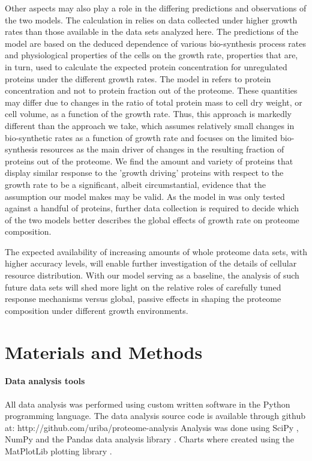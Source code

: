 \documentclass[10pt,letterpaper]{article}
\begin{document}
Other aspects may also play a role in the differing predictions and observations of the two models.
The calculation in \cite{Klumpp2009} relies on data collected under higher growth rates than those available in the data sets analyzed here.
The predictions of the model are based on the deduced dependence of various bio-synthesis process rates and physiological properties of the cells on the growth rate, properties that are, in turn, used to calculate the expected protein concentration for unregulated proteins under the different growth rates.
The model in \cite{Klumpp2009} refers to protein concentration and not to protein fraction out of the proteome. These quantities may differ due to changes in the ratio of total protein mass to cell dry weight, or cell volume, as a function of the growth rate.
Thus, this approach is markedly different than the approach we take, which assumes relatively small changes in bio-synthetic rates as a function of growth rate and focuses on the limited bio-synthesis resources as the main driver of changes in the resulting fraction of proteins out of the proteome.
We find the amount and variety of proteins that display similar response to the 'growth driving' proteins with respect to the growth rate to be a significant, albeit circumstantial, evidence that the assumption our model makes may be valid.
As the model in \cite{Klumpp2009} was only tested against a handful of proteins, further data collection is required to decide which of the two models better describes the global effects of growth rate on proteome composition.

The expected availability of increasing amounts of whole proteome data sets, with higher accuracy levels, will enable further investigation of the details of cellular resource distribution.
With our model serving as a baseline, the analysis of such future data sets will shed more light on the relative roles of carefully tuned response mechanisms versus global, passive effects in shaping the proteome composition under different growth environments.

\section*{Materials and Methods}
\paragraph{Data analysis tools}

All data analysis was performed using custom written software in the Python programming language.
The data analysis source code is available through github at: http://github.com/uriba/proteome-analysis
Analysis was done using SciPy \cite{Oliphant2007}, NumPy \cite{Community2011} and the Pandas data analysis library \cite{McKinney2011}.
Charts where created using the MatPlotLib plotting library \cite{Hunter2007}.
\end{document}
